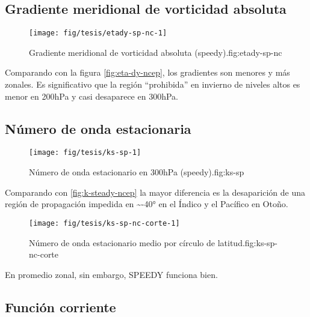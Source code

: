 \documentclass[spanish,a4paper]{book}
\begin{document}
\subsection{Gradiente meridional de vorticidad
absoluta}\label{gradiente-meridional-de-vorticidad-absoluta-1}

\begin{figure}

{\centering \texttt{[image: fig/tesis/etady-sp-nc-1]} 

}

\caption{Gradiente meridional de vorticidad absoluta (speedy).{fig:etady-sp-nc}}\label{fig:etady-sp-nc}
\end{figure}

Comparando con la figura \autoref{fig:eta-dy-ncep}, los gradientes son
menores y más zonales. Es significativo que la región ``prohibida'' en
invierno de niveles altos es menor en 200hPa y casi desaparece en
300hPa.

\subsection{Número de onda
estacionaria}\label{numero-de-onda-estacionaria}

\begin{figure}
\texttt{[image: fig/tesis/ks-sp-1]} \caption{Número de onda estacionario en 300hPa (speedy).{fig:ks-sp}}\label{fig:ks-sp}
\end{figure}

Comparando con \autoref{fig:k-steady-ncep} la mayor diferencia es la
desaparición de una región de propagación impedida en
\textasciitilde{}-40° en el Índico y el Pacífico en Otoño.

\begin{figure}

{\centering \texttt{[image: fig/tesis/ks-sp-nc-corte-1]} 

}

\caption{Número de onda estacionario medio por círculo de latitud.{fig:ks-sp-nc-corte}}\label{fig:ks-sp-nc-corte}
\end{figure}

En promedio zonal, sin embargo, SPEEDY funciona bien.

\subsection{Función corriente}\label{funcion-corriente-2}
\end{document}
